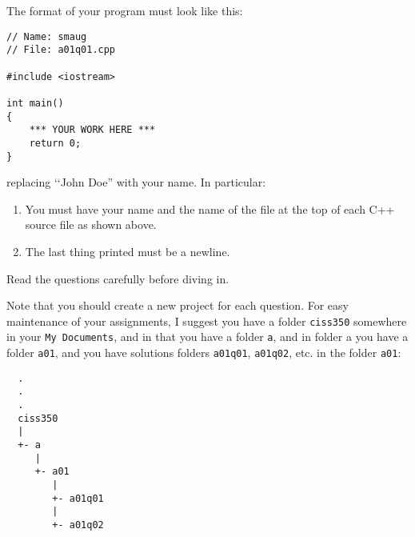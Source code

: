 The format of your program must look like this:

\begin{Verbatim}[frame=single]
// Name: smaug
// File: a01q01.cpp

#include <iostream>

int main()
{
    *** YOUR WORK HERE ***
    return 0;
}
\end{Verbatim}
replacing \lq\lq John Doe'' with your name.
In particular:
\begin{enumerate}
\item You must have your name and the name of the file at the top of each 
C++ source file as shown above.
\item The last thing printed must be a newline.
\end{enumerate}

Read the questions carefully before diving in.

Note that you should create a new project for each question. 
For easy maintenance of your assignments, 
I suggest you have a folder \verb!ciss350! somewhere in your 
\verb!My Documents!, 
and in that you have a folder 
\verb!a!, 
and in folder a you have a folder 
\verb!a01!, 
and you have solutions folders 
\verb!a01q01!,
\verb!a01q02!, etc. in the folder 
\verb!a01!:


\begin{verbatim}
  .
  .
  .
  ciss350
  |
  +- a
     |
     +- a01
        |
        +- a01q01
        |
        +- a01q02
\end{verbatim}

